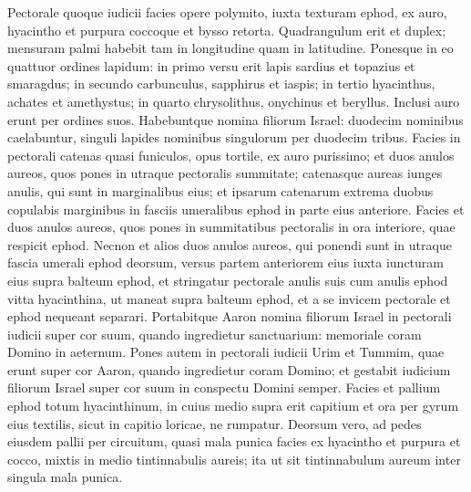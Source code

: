 \begin{biblechapter}
\begin{biblechapter}
\begin{biblechapter}
\begin{biblechapter}
\begin{biblechapter}
\begin{biblechapter}
\begin{biblechapter}
\begin{biblechapter}
\begin{biblechapter}
\begin{biblechapter}
\begin{biblechapter}
\begin{biblechapter}
\begin{biblechapter}
\begin{biblechapter}
\begin{biblechapter}
\begin{biblechapter}
\begin{biblechapter}
\begin{biblechapter}
\begin{biblechapter}
\begin{biblechapter}
\begin{biblechapter}
\begin{biblechapter}
\begin{biblechapter}
\begin{biblechapter}
\begin{biblechapter}
\begin{biblechapter}
\begin{biblechapter}
\begin{biblechapter}
 \verse Pectorale quoque iudicii facies opere polymito, iuxta texturam ephod, ex auro, hyacintho et purpura coccoque et bysso retorta. 
\verse Quadrangulum erit et duplex; mensuram palmi habebit tam in longitudine quam in latitudine. 
\verse Ponesque in eo quattuor ordines lapidum: in primo versu erit lapis sardius et topazius et smaragdus; 
\verse in secundo carbunculus, sapphirus et iaspis; 
 \verse in tertio hyacinthus, achates et amethystus; 
\verse in quarto chrysolithus, onychinus et beryllus. Inclusi auro erunt per ordines suos. 
\verse Habebuntque nomina filiorum Israel: duodecim nominibus caelabuntur, singuli lapides nominibus singulorum per duodecim tribus. 
\verse Facies in pectorali catenas quasi funiculos, opus tortile, ex auro purissimo; 
\verse et duos anulos aureos, quos pones in utraque pectoralis summitate; 
\verse catenasque aureas iunges anulis, qui sunt in marginalibus eius; 
\verse et ipsarum catenarum extrema duobus copulabis marginibus in fasciis umeralibus ephod in parte eius anteriore. 
 \verse Facies et duos anulos aureos, quos pones in summitatibus pectoralis in ora interiore, quae respicit ephod. 
\verse Necnon et alios duos anulos aureos, qui ponendi sunt in utraque fascia umerali ephod deorsum, versus partem anteriorem eius iuxta iuncturam eius supra balteum ephod, 
\verse et stringatur pectorale anulis suis cum anulis ephod vitta hyacinthina, ut maneat supra balteum ephod, et a se invicem pectorale et ephod nequeant separari. 
\verse Portabitque Aaron nomina filiorum Israel in pectorali iudicii super cor suum, quando ingredietur sanctuarium: memoriale coram Domino in aeternum. 
\verse Pones autem in pectorali iudicii Urim et Tummim, quae erunt super cor Aaron, quando ingredietur coram Domino; et gestabit iudicium filiorum Israel super cor suum in conspectu Domini semper.
 \verse Facies et pallium ephod totum hyacinthinum, 
\verse in cuius medio supra erit capitium et ora per gyrum eius textilis, sicut in capitio loricae, ne rumpatur. 
\verse Deorsum vero, ad pedes eiusdem pallii per circuitum, quasi mala punica facies ex hyacintho et purpura et cocco, mixtis in medio tintinnabulis aureis; 
 \verse ita ut sit tintinnabulum aureum inter singula mala punica. 

\end{biblechapter}
\end{biblechapter}
\end{biblechapter}
\end{biblechapter}
\end{biblechapter}
\end{biblechapter}
\end{biblechapter}
\end{biblechapter}
\end{biblechapter}
\end{biblechapter}
\end{biblechapter}
\end{biblechapter}
\end{biblechapter}
\end{biblechapter}
\end{biblechapter}
\end{biblechapter}
\end{biblechapter}
\end{biblechapter}
\end{biblechapter}
\end{biblechapter}
\end{biblechapter}
\end{biblechapter}
\end{biblechapter}
\end{biblechapter}
\end{biblechapter}
\end{biblechapter}
\end{biblechapter}
\end{biblechapter}
